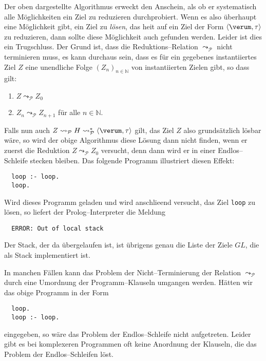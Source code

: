 Der oben dargestellte Algorithmus erweckt den Anschein, als ob er systematisch alle
M\"{o}glichkeiten ein Ziel zu reduzieren durchprobiert.  Wenn es also \"{u}berhaupt eine
M\"{o}glichkeit gibt, ein Ziel zu \emph{l\"{o}sen}, das hei\3t auf ein Ziel der Form 
 $\langle \verum, \tau \rangle$ zu reduzieren, dann sollte diese M\"{o}glichkeit auch gefunden
 werden.  Leider ist dies ein Trugschluss.  Der Grund ist, dass die Reduktions--Relation
$\leadsto_\mathcal{P}$ nicht terminieren muss, es kann durchaus sein, dass es f\"{u}r ein
gegebenes instantiiertes Ziel $Z$ eine unendliche Folge $(Z_n)_{n\in \mathbb{N}}$ von instantiierten Zielen gibt, so
dass gilt:
\begin{enumerate}
\item $Z \leadsto_\mathcal{P} Z_0$
\item $Z_n \leadsto_\mathcal{P} Z_{n+1}$ \quad f\"{u}r alle $n\in\mathbb{N}$.
\end{enumerate}
Falls nun auch $Z \leadsto_\mathcal{P} H \leadsto_\mathcal{P}^* \langle \verum, \tau \rangle$ gilt, 
das Ziel $Z$ also grunds\"{a}tzlich l\"{o}sbar w\"{a}re, so wird der obige Algorithmus diese L\"{o}sung
dann nicht finden, wenn er zuerst die Reduktion $Z \leadsto_\mathcal{P} Z_0$ versucht, denn
dann wird er in einer Endlos--Schleife stecken bleiben.  Das folgende Programm illustriert
diesen Effekt:
\begin{verbatim}
  loop :- loop.
  loop.
\end{verbatim}
Wird dieses Programm geladen und wird anschlie\3end versucht, das Ziel \texttt{loop} zu
l\"{o}sen, so liefert der Prolog--Interpreter die Meldung
\begin{verbatim}
  ERROR: Out of local stack
\end{verbatim}
Der Stack, der da \"{u}bergelaufen ist, ist \"{u}brigens genau die Liste der Ziele $G\!L$, die als Stack
implementiert ist.

In manchen F\"{a}llen kann  das Problem der Nicht--Terminierung der Relation
$\leadsto_\mathcal{P}$ durch eine Umordnung der Programm--Klauseln umgangen werden.
H\"{a}tten wir das obige Programm in  der Form
\begin{verbatim}
  loop.
  loop :- loop.
\end{verbatim}
eingegeben, so w\"{a}re das Problem der Endlos--Schleife nicht aufgetreten.  Leider gibt es bei
komplexeren Programmen oft keine Anordnung der Klauseln, die das Problem der
Endlos--Schleifen l\"{o}st.  

